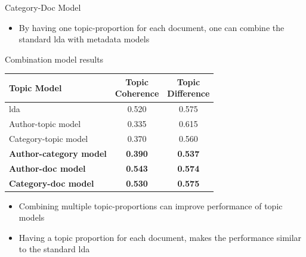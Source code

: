 \begin{frame}{\insertsubsection}{Category-Doc Model}
	\begin{figure}
		\centering
		\resizebox{0.35\columnwidth}{!}{%
			
		}
	\end{figure}
	\begin{itemize}
		\item<1-> By having one topic-proportion for each document, one can combine the standard \acrshort{lda} with metadata models
	\end{itemize}
\end{frame}

\begin{frame}{\insertsubsection}{Combination model results}
	\begin{table}
		\centering
		\begin{tabular}{l|c|c}
			Topic Model & \makecell{Topic \\ Coherence} & \makecell{Topic \\ Difference} \\
			\midrule
			\Acrlong{lda} & 0.520 & 0.575 \\
			Author-topic model & 0.335 & 0.615 \\
			Category-topic model & 0.370 & 0.560 \\
			\textbf{Author-category model} & \textbf{0.390} & \textbf{0.537} \\
			\textbf{Author-doc model} & \textbf{0.543} & \textbf{0.574} \\
			\textbf{Category-doc model} &\textbf{ 0.530} & \textbf{0.575} \\
		\end{tabular}
	\end{table}
	\begin{itemize}
		\item<2-> Combining multiple topic-proportions can improve performance of topic models
		\item<3-> Having a topic proportion for each document, makes the performance similar to the standard \acrshort{lda}
	\end{itemize}
\end{frame}

